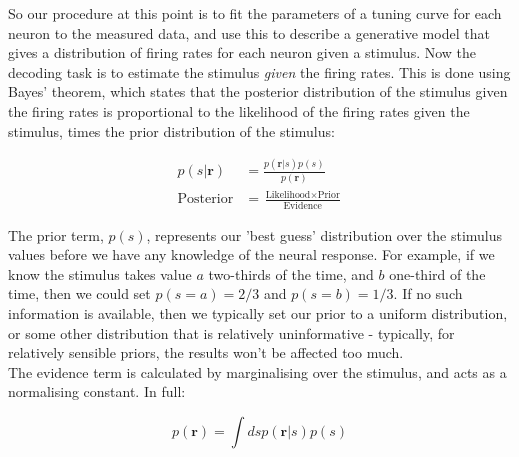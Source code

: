 \documentclass{article}
\begin{document}
\begin{figure}[H]

\end{figure}

So our procedure at this point is to fit the parameters of a tuning curve for each neuron to the measured data, and use this to describe a generative model that gives a distribution of firing rates for each neuron given a stimulus. Now the decoding task is to estimate the stimulus \textit{given} the firing rates. This is done using Bayes' theorem, which states that the posterior distribution of the stimulus given the firing rates is proportional to the likelihood of the firing rates given the stimulus, times the prior distribution of the stimulus:

\begin{align*}
    p(s|\bm{r}) &= \frac{p(\bm{r}|s)p(s)}{p(\bm{r})}\\[10pt]
    \text{Posterior} &= \frac{\text{Likelihood} \times \text{Prior}}{\text{Evidence}}
\end{align*}

The prior term, $p(s)$, represents our 'best guess' distribution over the stimulus values before we have any knowledge of the neural response. For example, if we know the stimulus takes value $a$ two-thirds of the time, and $b$ one-third of the time, then we could set $p(s=a)=2/3$ and $p(s=b)=1/3$. If no such information is available, then we typically set our prior to a uniform distribution, or some other distribution that is relatively uninformative - typically, for relatively sensible priors, the results won't be affected too much.\\

The evidence term is calculated by marginalising over the stimulus, and acts as a normalising constant. In full:

\begin{equation*}
    p(\bm{r}) = \int ds p(\bm{r}|s)p(s)
\end{equation*}
\end{document}
